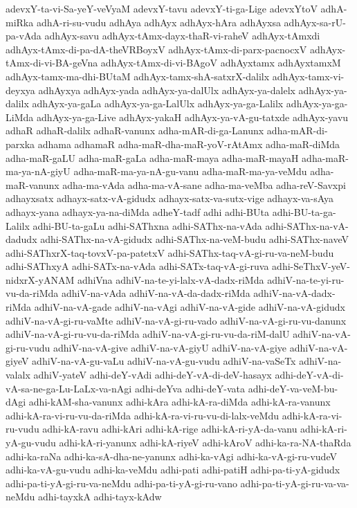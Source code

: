 {adevxY-ta-vi-Sa-yeY-veVyaM
adevxY-tavu
adevxY-ti-ga-Lige
adevxYtoV
adhA-miRka
adhA-ri-su-vudu
adhAya
adhAyx
adhAyx-hAra
adhAyxsa
adhAyx-sa-rU-pa-vAda
adhAyx-savu
adhAyx-tAmx-dayx-thaR-vi-raheV
adhAyx-tAmxdi
adhAyx-tAmx-di-pa-dA-theVRBoyxV
adhAyx-tAmx-di-parx-pacnocxV
adhAyx-tAmx-di-vi-BA-geVna
adhAyx-tAmx-di-vi-BAgoV
adhAyxtamx
adhAyxtamxM
adhAyx-tamx-ma-dhi-BUtaM
adhAyx-tamx-shA-satxrX-dalilx
adhAyx-tamx-vi-deyxya
adhAyxya
adhAyx-yada
adhAyx-ya-dalUlx
adhAyx-ya-dalelx
adhAyx-ya-dalilx
adhAyx-ya-gaLa
adhAyx-ya-ga-LalUlx
adhAyx-ya-ga-Lalilx
adhAyx-ya-ga-LiMda
adhAyx-ya-ga-Live
adhAyx-yakaH
adhAyx-ya-vA-gu-tatxde
adhAyx-yavu
adhaR
adhaR-dalilx
adhaR-vanunx
adha-mAR-di-ga-Lanunx
adha-mAR-di-parxka
adhama
adhamaR
adha-maR-dha-maR-yoV-rAtAmx
adha-maR-diMda
adha-maR-gaLU
adha-maR-gaLa
adha-maR-maya
adha-maR-mayaH
adha-maR-ma-ya-nA-giyU
adha-maR-ma-ya-nA-gu-vanu
adha-maR-ma-ya-veMdu
adha-maR-vanunx
adha-ma-vAda
adha-ma-vA-sane
adha-ma-veMba
adha-reV-Savxpi
adhayxsatx
adhayx-satx-vA-gidudx
adhayx-satx-va-sutx-vige
adhayx-va-sAya
adhayx-yana
adhayx-ya-na-diMda
adheY-tadf
adhi
adhi-BUta
adhi-BU-ta-ga-Lalilx
adhi-BU-ta-gaLu
adhi-SAThxna
adhi-SAThx-na-vAda
adhi-SAThx-na-vA-dadudx
adhi-SAThx-na-vA-gidudx
adhi-SAThx-na-veM-budu
adhi-SAThx-naveV
adhi-SAThxrX-taq-tovxV-pa-patetxV
adhi-SAThx-taq-vA-gi-ru-va-neM-budu
adhi-SAThxyA
adhi-SATx-na-vAda
adhi-SATx-taq-vA-gi-ruva
adhi-SeThxV-yeV-nidxrX-yANAM
adhiVna
adhiV-na-te-yi-lalx-vA-dadx-riMda
adhiV-na-te-yi-ru-vu-da-riMda
adhiV-na-vAda
adhiV-na-vA-da-dadx-riMda
adhiV-na-vA-dadx-riMda
adhiV-na-vA-gade
adhiV-na-vAgi
adhiV-na-vA-gide
adhiV-na-vA-gidudx
adhiV-na-vA-gi-ru-vaMte
adhiV-na-vA-gi-ru-vado
adhiV-na-vA-gi-ru-vu-danunx
adhiV-na-vA-gi-ru-vu-da-riMda
adhiV-na-vA-gi-ru-vu-da-riM-dalU
adhiV-na-vA-gi-ru-vudu
adhiV-na-vA-give
adhiV-na-vA-giyU
adhiV-na-vA-giye
adhiV-na-vA-giyeV
adhiV-na-vA-gu-vaLu
adhiV-na-vA-gu-vudu
adhiV-na-vaSeTx
adhiV-na-valalx
adhiV-yateV
adhi-deY-vAdi
adhi-deY-vA-di-deV-hasayx
adhi-deY-vA-di-vA-sa-ne-ga-Lu-LaLx-va-nAgi
adhi-deYva
adhi-deY-vata
adhi-deY-va-veM-bu-dAgi
adhi-kAM-sha-vanunx
adhi-kAra
adhi-kA-ra-diMda
adhi-kA-ra-vanunx
adhi-kA-ra-vi-ru-vu-da-riMda
adhi-kA-ra-vi-ru-vu-di-lalx-veMdu
adhi-kA-ra-vi-ru-vudu
adhi-kA-ravu
adhi-kAri
adhi-kA-rige
adhi-kA-ri-yA-da-vanu
adhi-kA-ri-yA-gu-vudu
adhi-kA-ri-yanunx
adhi-kA-riyeV
adhi-kAroV
adhi-ka-ra-NA-thaRda
adhi-ka-raNa
adhi-ka-sA-dha-ne-yanunx
adhi-ka-vAgi
adhi-ka-vA-gi-ru-vudeV
adhi-ka-vA-gu-vudu
adhi-ka-veMdu
adhi-pati
adhi-patiH
adhi-pa-ti-yA-gidudx
adhi-pa-ti-yA-gi-ru-va-neMdu
adhi-pa-ti-yA-gi-ru-vano
adhi-pa-ti-yA-gi-ru-va-va-neMdu
adhi-tayxkA
adhi-tayx-kAdw
}
